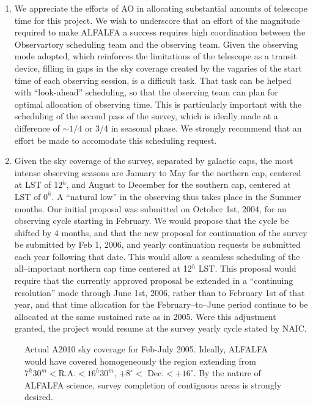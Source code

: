 \begin {enumerate}
\item We appreciate the efforts of AO in allocating substantial amounts of telescope
time for this project. We wish to underscore that an effort of the magnitude
required to make ALFALFA a success requires high coordination between the 
Observartory scheduling team and the observing team. Given the observing mode
adopted, which reinforces the limitations of the telescope as a transit device,
filling in gaps in the sky coverage created by the vagaries of the start time
of each observing session, is a difficult task. That task can be helped with
``look-ahead'' scheduling, so that the observing team can plan for optimal
allocation of observing time. This is particularly important with the scheduling
of the second pass of the survey, which is ideally made at a difference of
$\sim 1/4$ or 3/4 in seasonal phase. We strongly recommend that an effort be
made to accomodate this scheduling request.

\item Given the sky coverage of the survey, separated by galactic caps, the most
intense observing seasons are January to May for the northern cap, centered at
LST of 12$^h$, and August to December for the southern cap, centered at LST of
$0^h$. A ``natural low'' in the observing thus takes place in the Summer months.
Our initial proposal was submitted on October 1st, 2004, for an observing cycle
starting in February. We would propose that the cycle be shifted by 4 months,
and that the new proposal for continuation of the survey be submitted by Feb 1, 
2006, and yearly continuation requests be submitted each year following that 
date. This would allow a seamless scheduling of the
all--important northern cap time centered at 12$^h$ LST. This proposal would
require that the currently approved proposal be extended in a ``continuing
resolution'' mode through June 1st, 2006, rather than to February 1st of that
year, and that time allocation for the February--to--June period continue to
be allocated at the same sustained rate as in 2005. Were this adjustment 
granted, the project would resume at the survey yearly cycle stated by NAIC.
\end{enumerate}

\eject
\begin{figure}[ht]
\vskip 2.45in
\caption[]{\small
{Actual A2010 sky coverage for Feb-July 2005. Ideally, ALFALFA
would have covered homogeneously the region extending
from $7^h30^m <$R.A.$<16^h30^m$, $+8^\circ<$ Dec.$< +16^\circ$.
By the nature of ALFALFA science, survey completion of contiguous areas
is strongly desired.}}
\end{figure}



